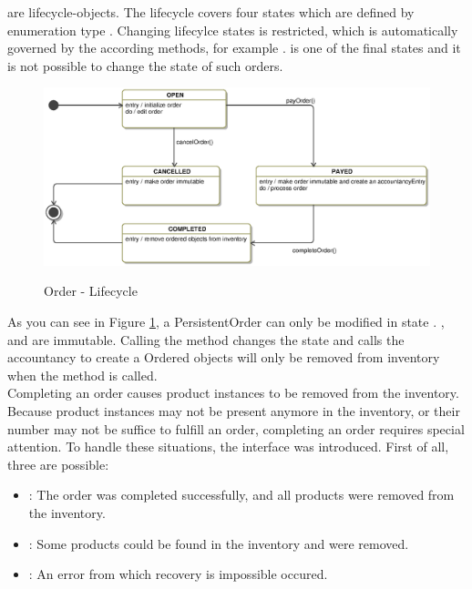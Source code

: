  are lifecycle-objects.
The lifecycle covers four states which are defined by enumeration type .
Changing lifecylce states is restricted, which is automatically governed by the according methods, for example .
 is one of the final states and it is not possible to change the state of such orders.

\begin{figure}
	\centering
  \includegraphics[width=1.0\textwidth]{images/Order_StateMachine.eps}
  \label{order_statemachine}
	\caption{Order - Lifecycle}
\end{figure}  

As you can see in Figure \ref{order_statemachine}, a PersistentOrder can only be modified in state .
,  and   are immutable.
Calling the  method changes the state and calls the accountancy to create a 
Ordered objects will only be removed from inventory when the  method is called.  
\\

Completing an order causes product instances to be removed from the inventory.
Because product instances may not be present anymore in the inventory, or their number may not be suffice to fulfill an order, completing an order requires special attention.
To handle these situations, the  interface was introduced.
First of all, three  are possible:

\begin{itemize}
\item {}: The order was completed successfully, and all products were removed from the inventory. 
\item {}: Some products could be found in the inventory and were removed.
\item {}: An error from which recovery is impossible occured.
\end{itemize}

